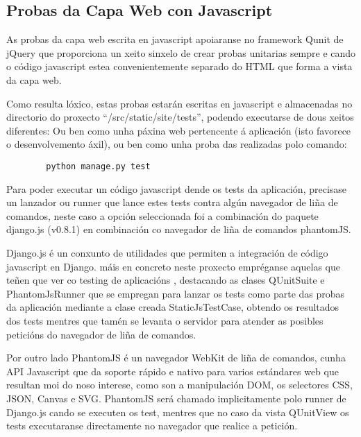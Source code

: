     \subsection{Probas da Capa Web con Javascript}
        As probas da capa web escrita en javascript apoiaranse no framework Qunit de 
        jQuery que proporciona un xeito sinxelo de crear probas unitarias sempre e cando o código 
        javascript estea convenientemente separado do HTML que forma a vista da capa web.
        
        Como resulta lóxico, estas probas estarán escritas en javascript e almacenadas no directorio
        do proxecto ``/src/static/site/tests'', podendo executarse de dous xeitos diferentes: Ou ben 
        como unha páxina web pertencente á aplicación (isto favorece o desenvolvemento áxil), ou ben
        como unha proba das realizadas polo comando:
        \begin{verbatim}
        python manage.py test
        \end{verbatim}
        
        Para poder executar un código javascript dende os tests da aplicación, 
        precisase un lanzador ou runner que lance estes tests contra algún navegador de liña de 
        comandos, neste caso a opción seleccionada foi a combinación do paquete django.js (v0.8.1)
        en combinación co navegador de liña de comandos phantomJS. 
        
        Django.js é un conxunto de utilidades que permiten a integración de código javascript en 
        Django. máis en concreto neste proxecto empréganse aquelas que teñen que ver co testing de
        aplicacións \cite{DjangojsTestTools}, destacando as clases QUnitSuite e PhantomJsRunner que se
        empregan para lanzar os tests como parte das probas da aplicación mediante a clase creada
        StaticJsTestCase, obtendo os resultados dos tests mentres que tamén se levanta o servidor
        para atender as posibles peticións do navegador de liña de comandos.
        
        Por outro lado PhantomJS é un navegador WebKit de liña de comandos, cunha API Javascript que
        da soporte rápido e nativo para varios estándares web que resultan moi do noso interese,
        como son a manipulación DOM, os selectores CSS, JSON, Canvas e SVG. PhantomJS será chamado
        implicitamente polo runner de Django.js cando se executen os test, mentres que no caso da 
        vista QUnitView os tests executaranse directamente no navegador que realice a petición.
        
